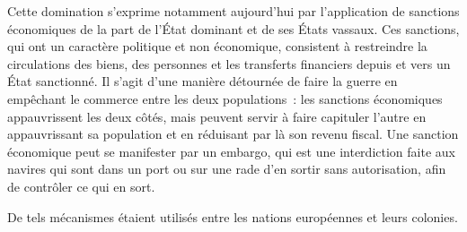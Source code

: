 

Cette domination s'exprime notamment aujourd'hui par l'application de sanctions économiques de la part de l'État dominant et de ses États vassaux. Ces sanctions, qui ont un caractère politique et non économique, consistent à restreindre la circulations des biens, des personnes et les transferts financiers depuis et vers un État sanctionné. Il s'agit d'une manière détournée de faire la guerre en empêchant le commerce entre les deux populations~: les sanctions économiques appauvrissent les deux côtés, mais peuvent servir à faire capituler l'autre en appauvrissant sa population et en réduisant par là son revenu fiscal. Une sanction économique peut se manifester par un embargo, qui est une interdiction faite aux navires qui sont dans un port ou sur une rade d'en sortir sans autorisation, afin de contrôler ce qui en sort.


De tels mécanismes étaient utilisés entre les nations européennes et leurs colonies.

